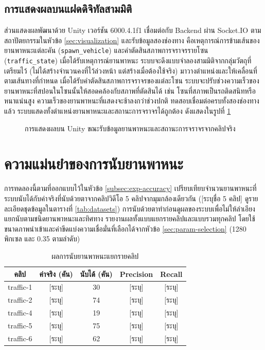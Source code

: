 \subsection{การแสดงผลบนแฝดดิจิทัลสามมิติ}
\label{subsec:proto-unity}

ส่วนแสดงผลพัฒนาด้วย Unity เวอร์ชัน 6000.4.1f1 เชื่อมต่อกับ Backend ผ่าน Socket.IO ตามสถาปัตยกรรมในหัวข้อ \ref{sec:visualization} และรับข้อมูลสองช่องทาง คือเหตุการณ์การข้ามเส้นของยานพาหนะแต่ละคัน (\texttt{spawn\_vehicle}) และคำตัดสินสภาพการจราจรรายโซน (\texttt{traffic\_state}) เมื่อได้รับเหตุการณ์ยานพาหนะ ระบบจะดึงแบบจำลองสามมิติจากกลุ่มวัตถุที่เตรียมไว้ (ไม่ได้สร้างจำนวนคงที่ไว้ล่วงหน้า แต่สร้างเมื่อต้องใช้จริง) มาวางตำแหน่งและให้เคลื่อนที่ตามเส้นทางที่กำหนด เมื่อได้รับคำตัดสินสภาพการจราจรของแต่ละโซน ระบบจะปรับช่วงความเร็วของยานพาหนะที่สปอนในโซนนั้นให้สอดคล้องกับสภาพที่ตัดสินได้ เช่น โซนที่สภาพเป็นรถติดสนิทหรือหนาแน่นสูง ความเร็วของยานพาหนะที่แสดงจะช้าลงกว่าช่วงปกติ ทดสอบเชื่อมต่อครบทั้งสองช่องทางแล้ว ระบบแสดงทั้งตำแหน่งยานพาหนะและสถานะการจราจรได้ถูกต้อง ดังแสดงในรูปที่ \ref{fig:unity-live}

\begin{figure}[ht]
\centering
\caption{การแสดงผลบน Unity ขณะรับข้อมูลยานพาหนะและสถานะการจราจรจากคลิปจริง}
\label{fig:unity-live}
\end{figure}

\section{ความแม่นยำของการนับยานพาหนะ}
\label{sec:res-counting}

การทดลองนี้ตามที่ออกแบบไว้ในหัวข้อ \ref{subsec:exp-accuracy} เปรียบเทียบจำนวนยานพาหนะที่ระบบนับได้กับค่าจริงที่นับด้วยตาจากคลิปวิดีโอ 5 คลิปจากมุมกล้องเดียวกัน ([ระบุชื่อ 5 คลิป] ดูรายละเอียดชุดข้อมูลในตารางที่ \ref{tab:datasets}) การนับด้วยตาทำก่อนดูผลของระบบเพื่อไม่ให้ลำเอียง แยกนับตามชนิดยานพาหนะและทิศทาง รายงานผลทั้งแบบแยกรายคลิปและแบบรวมทุกคลิป โดยใช้ขนาดภาพนำเข้าและค่าขีดแบ่งความเชื่อมั่นที่เลือกได้จากหัวข้อ \ref{sec:param-selection} (1280 พิกเซล และ 0.35 ตามลำดับ)

\begin{table}[ht]
\centering
\caption{ผลการนับยานพาหนะแยกรายคลิป}
\label{tab:exp1-perclip}
\begin{tabular}{|c|c|c|c|c|}
\hline
คลิป & ค่าจริง (คัน) & นับได้ (คัน) & Precision & Recall \\
\hline
traffic-1 & [ระบุ] & 30 & [ระบุ] & [ระบุ] \\
\hline
traffic-2 & [ระบุ] & 74 & [ระบุ] & [ระบุ] \\
\hline
traffic-4 & [ระบุ] & 19 & [ระบุ] & [ระบุ] \\
\hline
traffic-5 & [ระบุ] & 75 & [ระบุ] & [ระบุ] \\
\hline
traffic-6 & [ระบุ] & 62 & [ระบุ] & [ระบุ] \\
\hline
\end{tabular}
\end{table}

